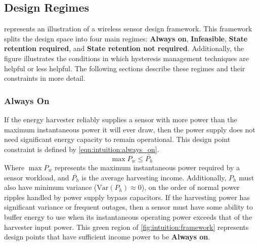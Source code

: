 
\subsection{Design Regimes}
\label{sec:framework:regime}
 represents an illustration of a wireless sensor design framework.
This framework splits the design space into four main regimes: \textbf{Always on},
\textbf{Infeasible}, \textbf{State retention required}, and \textbf{State retention not required}.
Additionally, the figure illustrates the conditions in which hysteresis management techniques are helpful or less helpful.
The following sections describe these regimes and their constraints in more detail. 

\subsubsection{Always On} 
If the energy harvester reliably supplies a sensor with
more power than the maximum instantaneous power it will ever draw, then the power supply does not need significant
energy capacity to remain operational. 
This design point constraint is defined by \cref{eqn:intuition:always_on}.
\begin{equation}
    \label{eqn:intuition:always_on}
    \max P_w \leq \bar{P_h}
\end{equation}
Where $\max P_w$ represents the maximum instantaneous power required by a sensor workload, and $\bar{P_h}$ is the average harvesting income. Additionally, $P_h$ must also have minimum variance ($\mathrm{Var}(P_h) \approx 0$), on the order of normal power ripples handled by power supply bypass capacitors.
If the harvesting power has significant variance or frequent outages, 
then a sensor must have some ability to buffer energy to use when its
instantaneous operating power exceeds that of the harvester input power.
This green region of \cref{fig:intuition:framework} represents design points that have sufficient income power to be \textbf{Always on}.

